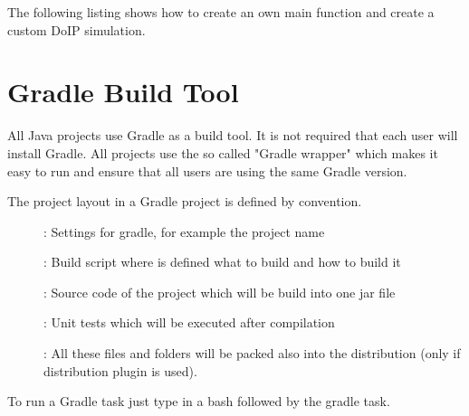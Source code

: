 \documentclass[a4paper]{doipdoc}
\begin{document}
		The following listing shows how to create an own main function
		and create a custom DoIP simulation.

		
		
		

		

\section{Gradle Build Tool}

	All Java projects use Gradle as a build tool. It is not required that
	each user will install Gradle. All projects use the so called 
	"Gradle wrapper" which makes it easy to run and ensure that all users
	are using the same Gradle version.

	The project layout in a Gradle project is defined by convention.

	\begin{description}

		\item[]: Settings for gradle, for example
		the project name

		\item[]: Build script where is defined what
		to build and how to build it

		\item[]: Source code of the project which will
		be build into one jar file

		\item[]: Unit tests which will be executed after
		compilation
		
		\item[]: All these files and folders will be packed 
		also into the distribution (only if distribution plugin is used).

	\end{description}

	To run a Gradle task just type  in a bash
	followed by the gradle task.
\end{document}
